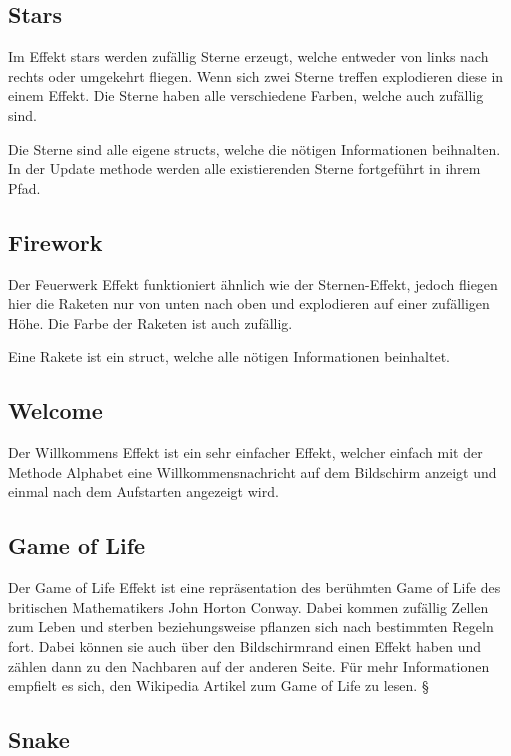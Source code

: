 \documentclass[12pt,a4paper]{article}
\begin{document}
\subsection{Stars}

Im Effekt stars werden zufällig Sterne erzeugt, welche entweder von links nach rechts oder umgekehrt fliegen. Wenn sich zwei Sterne treffen explodieren diese in einem Effekt. Die Sterne haben alle verschiedene Farben, welche auch zufällig sind. 

Die Sterne sind alle eigene structs, welche die nötigen Informationen beihnalten. In der Update methode werden alle existierenden Sterne fortgeführt in ihrem Pfad.

\subsection{Firework}

Der Feuerwerk Effekt funktioniert ähnlich wie der Sternen-Effekt, jedoch fliegen hier die Raketen nur von unten nach oben und explodieren auf einer zufälligen Höhe. Die Farbe der Raketen ist auch zufällig.

Eine Rakete ist ein struct, welche alle nötigen Informationen beinhaltet.

\subsection{Welcome}

Der Willkommens Effekt ist ein sehr einfacher Effekt, welcher einfach mit der Methode Alphabet eine Willkommensnachricht auf dem Bildschirm anzeigt und einmal nach dem Aufstarten angezeigt wird.

\subsection{Game of Life}

Der Game of Life Effekt ist eine repräsentation des berühmten Game of Life des britischen Mathematikers John Horton Conway. Dabei kommen  zufällig Zellen zum Leben und sterben beziehungsweise pflanzen sich nach bestimmten Regeln fort. Dabei können sie auch über den Bildschirmrand einen Effekt haben und zählen dann zu den Nachbaren auf der anderen Seite. Für mehr Informationen empfielt es sich, den Wikipedia Artikel zum Game of Life zu lesen.
§
\subsection{Snake}
\end{document}
